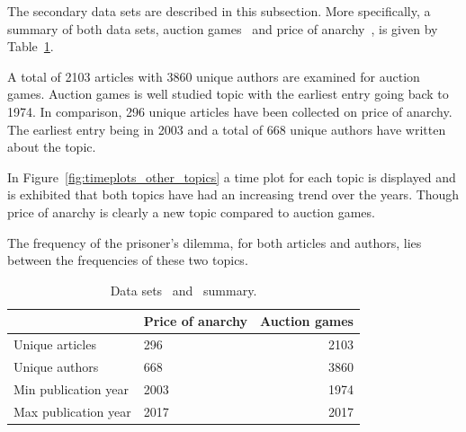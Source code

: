 \documentclass{article}
\theoremstyle{definition}
\begin{document}
The secondary data sets are described in this subsection. More specifically, a
summary of both data sets, auction games~\cite{} and price of anarchy~\cite{},
is given by Table~\ref{table:summary_other_topics}.

A total of 2103 articles with 3860 unique authors are examined for auction games.
Auction games is well studied topic with the earliest entry going
back to 1974. In comparison, 296 unique articles have been collected on price of
anarchy. The earliest entry being in 2003 and a total of 668 unique authors have
written about the topic.

In Figure~\ref{fig:timeplots_other_topics} a time plot for each topic is
displayed and is exhibited that both topics have had an increasing trend over
the years. Though price of anarchy is clearly a new topic compared to auction games.

The frequency of the prisoner's dilemma, for both articles and authors, lies
between the frequencies of these two topics.

\begin{table}[!hbtp]
    \begin{center}
    \begin{tabular}{llr}
        \toprule
         &            Price of anarchy &  Auction games \\
        \midrule
        Unique articles      & 296  & 2103 \\
        Unique authors       & 668  & 3860 \\
        Min publication year & 2003 & 1974 \\
        Max publication year & 2017 & 2017 \\
        \bottomrule
    \end{tabular}
    \end{center}
    \caption{Data sets~\cite{} and~\cite{} summary.}
    \label{table:summary_other_topics}
\end{table}
\end{document}
